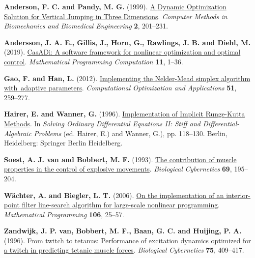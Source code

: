 \documentclass[
  11pt,
  a4paper]{article}
\newlength{\cslhangindent}
\newenvironment{CSLReferences}[2] %
 {\begin{list}{}{%
  \setlength{\itemindent}{0pt}
  \setlength{\leftmargin}{0pt}
  \setlength{\parsep}{0pt}
  \ifodd #1
   \setlength{\leftmargin}{\cslhangindent}
   \setlength{\itemindent}{-1\cslhangindent}
  \fi
  \setlength{\itemsep}{#2\baselineskip}}}
 {\end{list}}
\begin{document}
\begin{CSLReferences}{1}{1}
\textbf{Anderson, F. C. and Pandy, M. G.} (1999).
\href{https://doi.org/10.1080/10255849908907988}{A {Dynamic}
{Optimization} {Solution} for {Vertical} {Jumping} in {Three}
{Dimensions}}. \emph{Computer Methods in Biomechanics and Biomedical
Engineering} \textbf{2}, 201--231.

\textbf{Andersson, J. A. E., Gillis, J., Horn, G., Rawlings, J. B. and
Diehl, M.} (2019).
\href{https://doi.org/10.1007/s12532-018-0139-4}{{CasADi}: A software
framework for nonlinear optimization and optimal control}.
\emph{Mathematical Programming Computation} \textbf{11}, 1--36.

\textbf{Gao, F. and Han, L.} (2012).
\href{https://doi.org/10.1007/s10589-010-9329-3}{Implementing the
{Nelder}-{Mead} simplex algorithm with~adaptive parameters}.
\emph{Computational Optimization and Applications} \textbf{51},
259--277.

\textbf{Hairer, E. and Wanner, G.} (1996).
\href{https://doi.org/10.1007/978-3-642-05221-7_8}{Implementation of
{Implicit} {Runge}-{Kutta} {Methods}}. In \emph{Solving {Ordinary}
{Differential} {Equations} {II}: {Stiff} and {Differential}-{Algebraic}
{Problems}} (ed. Hairer, E.) and Wanner, G.), pp. 118--130. Berlin,
Heidelberg: Springer Berlin Heidelberg.

\textbf{Soest, A. J. van and Bobbert, M. F.} (1993).
\href{https://doi.org/10.1007/BF00198959}{The contribution of muscle
properties in the control of explosive movements}. \emph{Biological
Cybernetics} \textbf{69}, 195--204.

\textbf{Wächter, A. and Biegler, L. T.} (2006).
\href{https://doi.org/10.1007/s10107-004-0559-y}{On the implementation
of an interior-point filter line-search algorithm for large-scale
nonlinear programming}. \emph{Mathematical Programming} \textbf{106},
25--57.

\textbf{Zandwijk, J. P. van, Bobbert, M. F., Baan, G. C. and Huijing, P.
A.} (1996). \href{https://doi.org/10.1007/s004220050306}{From twitch to
tetanus: Performance of excitation dynamics optimized for a twitch in
predicting tetanic muscle forces}. \emph{Biological Cybernetics}
\textbf{75}, 409--417.

\end{CSLReferences}
\end{document}
